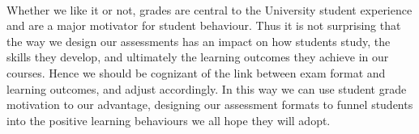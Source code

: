 \documentclass[12pt]{article}
\begin{document}
\paragraph{}
Whether we like it or not, grades are central to the University student experience and are a major motivator for student behaviour. Thus it is not surprising that the way we design our assessments has an impact on how students study, the skills they develop, and ultimately the learning outcomes they achieve in our courses. Hence we should be cognizant of the link between exam format and learning outcomes, and adjust accordingly. In this way we can use student grade motivation to our advantage, designing our assessment formats to funnel students into the positive learning behaviours we all hope they will adopt.



\end{document}
